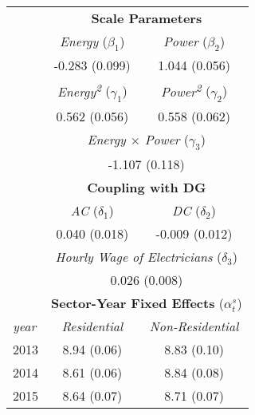 \begin{tabular}{lcc} \hline
\Tstrut                       & \multicolumn{2}{c}{\textbf{Scale Parameters}}                    \\ \cline{2-3} 
\Tstrut   \Bstrut                    & \textit{Energy} ($\beta_1$)             & \textit{Power} ($\beta_2$)              \\
                      &  -0.283 (0.099)                    & 1.044 (0.056)                     \\
[0.5em]
\Bstrut                    & \textit{Energy\textsuperscript{2}} ($\gamma_1$)             & \textit{Power\textsuperscript{2}} ($\gamma_2$)              \\
                      & 0.562 (0.056)                    & 0.558 (0.062)                     \\
[0.5em]
\Bstrut                    & \multicolumn{2}{c}{\textit{Energy $\times$ Power} ($\gamma_3$)}                    \\
                      & \multicolumn{2}{c}{-1.107 (0.118) }                                       \\
[0.5em]
  & \multicolumn{2}{c}{\textbf{Coupling with DG}}                    \\ \cline{2-3} 
\Tstrut   \Bstrut & \textit{AC} ($\delta_1$) & \textit{DC} ($\delta_2$) \\
                      & 0.040 (0.018)                    & -0.009 (0.012)                     \\
[0.5em]
\Bstrut                    & \multicolumn{2}{c}{\textit{Hourly Wage of Electricians} ($\delta_3$)}                    \\
                      & \multicolumn{2}{c}{0.026 (0.008) }                                       \\
[0.5em]
                      & \multicolumn{2}{c}{\textbf{Sector-Year Fixed Effects} ($\alpha^s_t$)} \\ \cline{2-3} 
\textit{year}	\Tstrut \Bstrut  & \textit{Residential}                   & \textit{Non-Residential}            \\
2013                  &   8.94 (0.06)                         &        8.83 (0.10)                    \\
2014                  &   8.61 (0.06)                         &        8.84 (0.08)                    \\
2015                  &   8.64 (0.07)                         &        8.71 (0.07)                    \\

\end{tabular}
